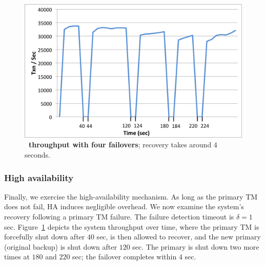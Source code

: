 \begin{figure}[h!]
\centerline{
\includegraphics[width=\columnwidth]{HA.png}
}
\caption{{\bf \sys\ throughput with four failovers}; recovery takes around $4$ seconds. }
\label{fig:ha_recovery}
\end{figure}


\subsubsection{High availability}
\label{sec:ha-eval}


Finally, we exercise the high-availability mechanism. As long as the primary TM does not fail, HA induces negligible overhead. 
We now examine the system's recovery following a primary TM failure.  
The failure detection timeout is $\delta=1$ sec.
Figure~\ref{fig:ha_recovery} depicts  the system throughput over time, where the primary TM is forcefully shut down 
after  $40$ sec, is then allowed to recover, and the new primary (original backup) is shut down after $120$ sec. 
The primary is shut down two more times at $180$ and $220$ sec; the failover completes within $4$ sec.




